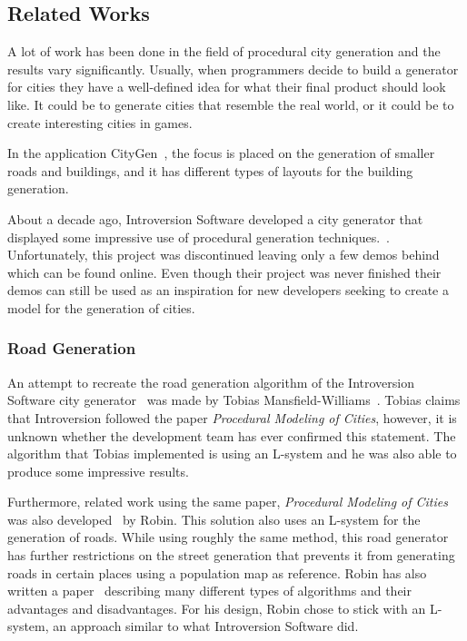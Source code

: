 \subsection{Related Works}
A lot of work has been done in the field of procedural city generation and the results vary significantly.
Usually, when programmers decide to build a generator for cities they have a well-defined idea for what their final product should look like.
It could be to generate cities that resemble the real world, or it could be to create interesting cities in games.

In the application CityGen~\cite{citygen}, the focus is placed on the generation of smaller roads and buildings, and it has different types of layouts for the building generation.

About a decade ago, Introversion Software developed a city generator that displayed some impressive use of procedural generation techniques.~\cite{citygen_subversion}. 
Unfortunately, this project was discontinued leaving only a few demos behind which can be found online.
Even though their project was never finished their demos can still be used as an inspiration for new developers seeking to create a model for the generation of cities.
 

\subsubsection{Road Generation}
An attempt to recreate the road generation algorithm of the Introversion Software city generator~\cite{citygen_subversion} was made by Tobias Mansfield-Williams~\cite{citygen_tobias}. 
Tobias claims that Introversion followed the paper \textit{Procedural Modeling of Cities}, however, it is unknown whether the development team has ever confirmed this statement. 
The algorithm that Tobias implemented is using an L-system and he was also able to produce some impressive results.

Furthermore, related work using the same paper,  \textit{Procedural Modeling of Cities} was also developed~\cite{citygen_robin} by Robin. 
This solution also uses an L-system for the generation of roads. 
While using roughly the same method, this road generator has further restrictions on the street generation that prevents it from generating roads in certain places using a population map as reference.
Robin has also written a paper~\cite{citygen_robin_paper} describing many different types of algorithms and their advantages and disadvantages. 
For his design, Robin chose to stick with an L-system, an approach similar to what Introversion Software did. 

